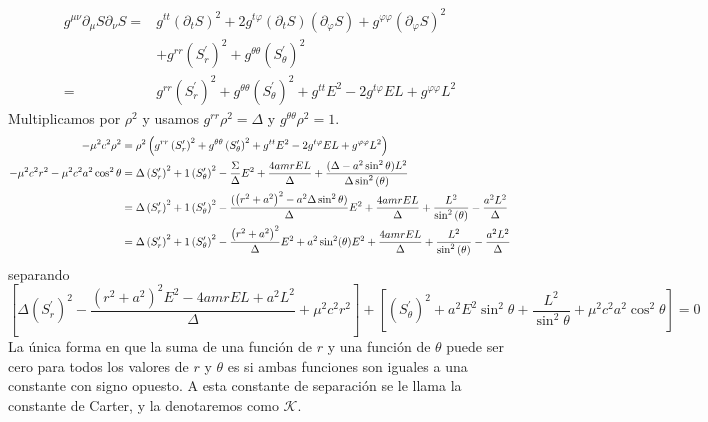 \begin{equation}
    \begin{aligned}
        g^{\mu \nu} \partial_\mu S \partial_\nu S= & g^{t t}\left(\partial_t S\right)^2+2 g^{t \varphi}\left(\partial_t S\right)\left(\partial_{\varphi} S\right)+g^{\varphi \varphi}\left(\partial_{\varphi} S\right)^2 \\
                                                   & +g^{r r}\left(S_r^{\prime}\right)^2+g^{\theta \theta}\left(S_\theta^{\prime}\right)^2                                                                               \\
        =                                          & g^{r r}\left(S_r^{\prime}\right)^2+g^{\theta \theta}\left(S_\theta^{\prime}\right)^2 +g^{t t} E^2-2 g^{t \varphi} E L+g^{\varphi \varphi} L^2
    \end{aligned}
\end{equation}
Multiplicamos por $\rho^2$ y usamos $g^{r r} \rho^2=\Delta$ y $g^{\theta \theta} \rho^2=1$.
\begin{equation}
    \begin{aligned}
        -\mu^2 c^2 \rho^2 & =\rho^2 \left(g^{r r}\left(S_r^{\prime}\right)^2+g^{\theta \theta}\left(S_\theta^{\prime}\right)^2 +g^{t t} E^2-2 g^{t \varphi} E L+g^{\varphi \varphi} L^2\right)                                           \\
                          -\mu^2 c^2 r^2-\mu^2 c^2 a^2 \cos ^2 \theta& = \Delta \left(S_r^{\prime}\right)^2+1\left(S_\theta^{\prime}\right)^2  - \frac{\Sigma}{\Delta}E^2+\frac{4 a m r EL}{\Delta } + \frac{ (\Delta-a^2 \sin ^2 \theta)L^2 }{\Delta  \sin^{2}{\left(\theta \right)}}\\
                          & = \Delta \left(S_r^{\prime}\right)^2+1\left(S_\theta^{\prime}\right)^2  - \frac{(\left(r^2+a^2\right)^2-a^2 \Delta \sin ^2 \theta)}{\Delta}E^2+\frac{4 a m r EL}{\Delta }  + \frac{L^2}{\sin^{2}{\left(\theta \right)}} - \frac{a^2 L^2}{\Delta}\\
                          & = \Delta \left(S_r^{\prime}\right)^2+1\left(S_\theta^{\prime}\right)^2  - \frac{\left(r^2+a^2\right)^2}{\Delta}E^2 +a^2  \sin ^2 (\theta)E^2+\frac{4 a m r EL}{\Delta }  + \frac{L^2}{\sin^{2}{\left(\theta \right)}} - \frac{a^2 L^2}{\Delta}\\  
    \end{aligned}
\end{equation}
separando
\begin{equation}
     \left[\Delta\left(S_r^{\prime}\right)^2-\frac{\left(r^2+a^2\right)^2 E^2-4 a m r E L+a^2 L^2}{\Delta}+\mu^2 c^2 r^2\right]+\left[\left(S_\theta^{\prime}\right)^2+a^2 E^2 \sin ^2 \theta+\frac{L^2}{\sin ^2 \theta}+\mu^2 c^2 a^2 \cos ^2 \theta\right] = 0
\end{equation}
La única forma en que la suma de una función de $r$ y una función de $\theta$ puede ser cero para todos los valores de $r$ y $\theta$ es si ambas funciones son iguales a una constante con signo opuesto. A esta constante de separación se le llama la constante de Carter, y la denotaremos como $\mathcal{K}$.

